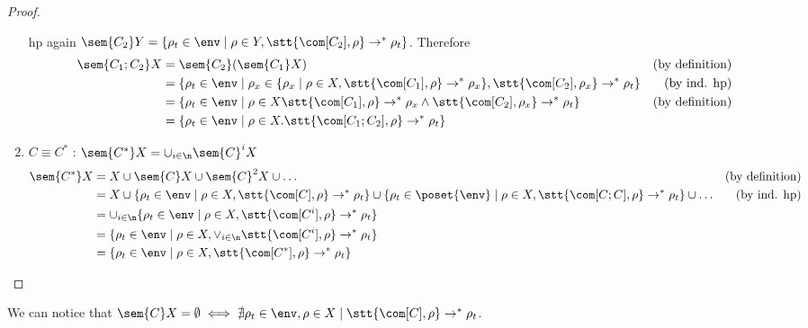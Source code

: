 \begin{proof}
\begin{enumerate}
    hp again \(\sem{C_2}Y = \{\rho_t \in\env \mid \rho \in Y, \stt{\com[C_2], \rho}
    \to^* \rho_t\}\). Therefore
    \begin{align*}
      \sem{C_1;C_2}X & = \sem{C_2}(\sem{C_1}X) & \text{(by definition)}\\
      & = \{\rho_t \in\env \mid \rho_x \in \{\rho_x \mid \rho \in X, \stt{\com[C_1], \rho}  \to^* \rho_x\}, \stt{\com[C_2], \rho_x} \to^* \rho_t\} & \text{(by ind. hp)}\\
      & = \{\rho_t \in\env \mid \rho \in X \stt{\com[C_1], \rho} \to^* \rho_x \wedge \stt{\com[C_2], \rho_x} \to^* \rho_t\} & \text{(by definition)}\\
      & = \{\rho_t \in\env \mid \rho \in X . \stt{\com[C_1;C_2], \rho} \to^* \rho_t\}
    \end{align*}
  \item \(C \equiv C^*\) : \(\sem{C^*}X = \cup_{i\in\n}\sem{C}^i X\)
    \begin{align*}
      \sem{C^*}X & = X \cup \sem{C}X \cup \sem{C}^2X \cup \dots & \text{(by definition)}\\
      & = X \cup \{\rho_t \in\env \mid \rho \in X, \stt{\com[C],\rho} \to^* \rho_t\} \cup \{\rho_t \in\poset{\env} \mid \rho \in X, \stt{\com[C;C],\rho} \to^* \rho_t\} \cup \dots & \text{(by ind. hp)}\\
      & = \cup_{i\in\n} \{\rho_t \in\env \mid \rho \in X, \stt{\com[C^i], \rho} \to^*  \rho_t\} \\
      & = \{\rho_t \in\env \mid \rho \in X, \vee_{i\in\n} \stt{\com[C^i], \rho} \to^* \rho_t\} \\
      & = \{\rho_t \in\env \mid \rho \in X, \stt{\com[C^*], \rho} \to^* \rho_t\}
    \end{align*}
  \end{enumerate}
\end{proof}

We can notice that \(\sem{C}X = \emptyset \iff \nexists \rho_t\in\env,
\rho \in X \mid \stt{\com[C],\rho} \to^* \rho_t\).
